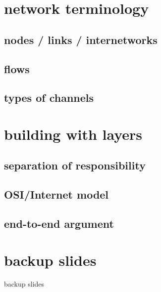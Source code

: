 \date{}
\title{}
\date{}

\begin{frame}
    \titlepage
\end{frame}

\section{network terminology}

\subsection{nodes / links / internetworks}



\subsection{flows}



\subsection{types of channels}



\section{building with layers}

\subsection{separation of responsibility}



\subsection{OSI/Internet model}



\subsection{end-to-end argument}




\section{backup slides}
\begin{frame}{backup slides}
\end{frame}


